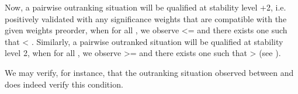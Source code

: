 \documentclass[a4paper,12pt,english]{sphinxhowto}
\begin{document}
\sphinxAtStartPar
Now, a pairwise outranking situation will be qualified at stability level +2, i.e. positively validated with any significance weights that are compatible with the given weights preorder, when for all , we observe  \textless{}=  and there exists one  such that  \textless{} . Similarly, a pairwise outranked situation will be qualified at stability level \sphinxhyphen{}2, when for all , we observe  \textgreater{}=  and there exists one  such that  \textgreater{}  (see ).

\sphinxAtStartPar
We may verify, for instance, that the outranking situation observed between  and  does indeed verify this  condition.
\end{document}
